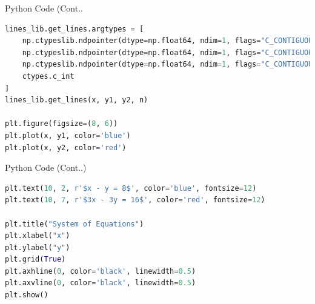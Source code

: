 \documentclass{beamer}
\begin{document}
\begin{frame}[fragile]{Python Code (Cont..}
\begin{lstlisting}[language=Python]
lines_lib.get_lines.argtypes = [
    np.ctypeslib.ndpointer(dtype=np.float64, ndim=1, flags="C_CONTIGUOUS"),
    np.ctypeslib.ndpointer(dtype=np.float64, ndim=1, flags="C_CONTIGUOUS"),
    np.ctypeslib.ndpointer(dtype=np.float64, ndim=1, flags="C_CONTIGUOUS"),
    ctypes.c_int
]
lines_lib.get_lines(x, y1, y2, n)

plt.figure(figsize=(8, 6))
plt.plot(x, y1, color='blue')
plt.plot(x, y2, color='red')
\end{lstlisting}
\end{frame}

\begin{frame}[fragile]{Python Code (Cont..)}
\begin{lstlisting}[language=Python]
plt.text(10, 2, r'$x - y = 8$', color='blue', fontsize=12)
plt.text(10, 7, r'$3x - 3y = 16$', color='red', fontsize=12)

plt.title("System of Equations")
plt.xlabel("x")
plt.ylabel("y")
plt.grid(True)
plt.axhline(0, color='black', linewidth=0.5)
plt.axvline(0, color='black', linewidth=0.5)
plt.show()
\end{lstlisting}
\end{frame}
\end{document}
